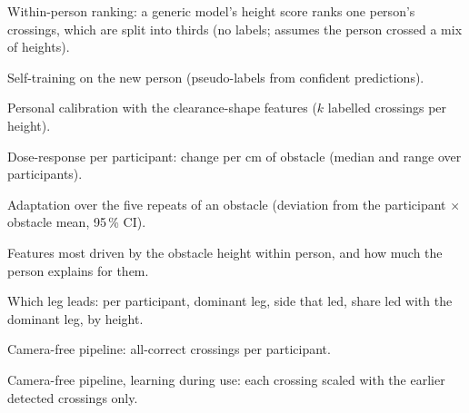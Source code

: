 \begin{table}[H]
\centering
\caption{Within-person ranking: a generic model's height score ranks one person's crossings, which are split into thirds (no labels;
assumes the person crossed a mix of heights).}
\label{tab:ranking}

\end{table}

\begin{table}[H]
\centering
\caption{Self-training on the new person (pseudo-labels from confident predictions).}
\label{tab:selftrain}

\end{table}

\begin{table}[H]
\centering
\caption{Personal calibration with the clearance-shape features ($k$ labelled crossings per height).}
\label{tab:fewshot}

\end{table}

\begin{table}[H]
\centering
\caption{Dose-response per participant: change per cm of obstacle (median and range over participants).}
\label{tab:storydose}

\end{table}

\begin{table}[H]
\centering
\caption{Adaptation over the five repeats of an obstacle (deviation from the participant $\times$ obstacle mean, 95\,\% CI).}
\label{tab:adapt}

\end{table}

\begin{table}[H]
\centering
\caption{Features most driven by the obstacle height within person, and how much the person explains for them.}
\label{tab:persontop}

\end{table}

\begin{table}[H]
\centering
\caption{Which leg leads: per participant, dominant leg, side that led, share led with the dominant leg, by height.}
\label{tab:leads}

\end{table}

\begin{table}[H]
\centering
\caption{Camera-free pipeline: all-correct crossings per participant.}
\label{tab:streampp}

\end{table}

\begin{table}[H]
\centering
\caption{Camera-free pipeline, learning during use: each crossing scaled with the earlier detected crossings only.}
\label{tab:streamcausal}

\end{table}

